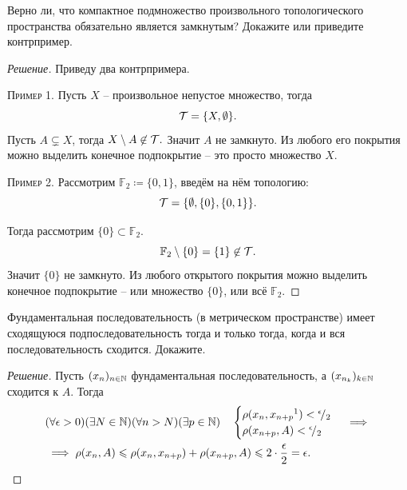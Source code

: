 \documentclass[10pt]{article}
\begin{document}
\date{7 февраля 2025}


\tableofcontents


\begin{tasks}
    \item Верно ли, что компактное подмножество произвольного то\-по\-ло\-ги\-чес\-ко\-го пространства обязательно является замкнутым? Докажите или приведите контрпример.
    \begin{proof}
        [Решение]
        Приведу два контрпримера.
        
        \textsc{Пример 1.} Пусть $X$ -- произвольное непустое множество, тогда $$\mathcal T = \{X, \emptyset\}.$$
        Пусть $A \subsetneq X$, тогда $X\setminus A \not \in \mathcal T.$ Значит $A$ не замкнуто. Из любого его покрытия можно выделить конечное подпокрытие -- это просто множество $X$.

        \textsc{Пример 2.} Рассмотрим $\mathbb F_2 \coloneq \{0,1\}$, введём на нём топологию: \[\mathcal T = \{\emptyset, \{0\}, \{0,1\}\}.\]
        
        Тогда рассмотрим $\{0\} \subset \mathbb F_2$. $$\mathbb F_2 \setminus \{0\} = \{1\} \not\in \mathcal T.$$ Значит $\{0\}$ не замкнуто. Из любого открытого покрытия можно выделить конечное подпокрытие -- или множество $\{0\}$, или всё $\mathbb F_2.$
        
    \end{proof}
    
    \item Фундаментальная последовательность (в метрическом пространстве) имеет сходящуюся подпоследовательность тогда и только тогда, когда и вся последовательность сходится. Докажите.

    \begin{proof}
        [Решение]
        
        Пусть $(x_n)_{n\in\mathbb N}$ фундаментальная последовательность, а $(x_{n_k})_{k\in \mathbb N}$ сходится к $A$. Тогда 
        \begin{equation}
            \begin{aligned}
                &(\forall \epsilon > 0)(\exists N \in \N)(\forall n > N)(\exists p \in \N)\quad \begin{cases}
                    \rho(x_n, x_{n+p}\footnotemark) < \rfrac \epsilon 2 \\
                    \rho(x_{n+p},A) < \rfrac \epsilon 2
                \end{cases} \implies \\
                &\implies \rho(x_n, A) \leqslant \rho(x_n, x_{n+p}) + \rho(x_{n+p}, A) \leqslant 2 \cdot \frac \epsilon 2 = \epsilon.
            \end{aligned}
        \end{equation}
        

\end{proof}
\end{tasks}
\end{document}
